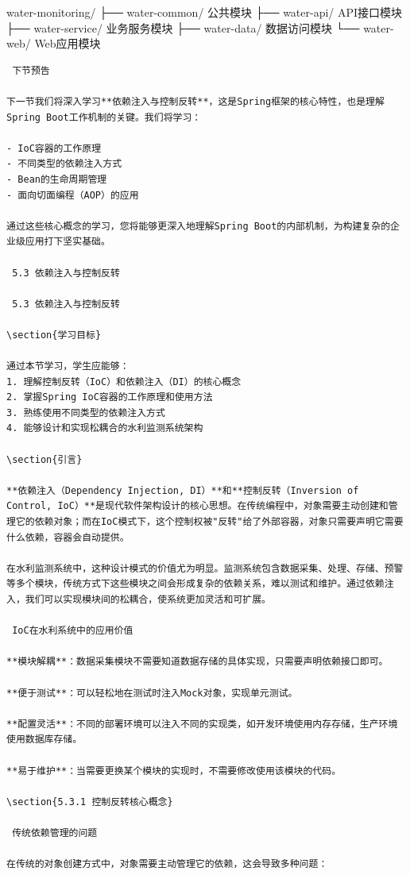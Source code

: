 water-monitoring/ ├── water-common/  公共模块 ├── water-api/  API接口模块\\
├── water-service/  业务服务模块 ├── water-data/  数据访问模块 └── water-web/  Web应用模块

\begin{lstlisting}
 下节预告

下一节我们将深入学习**依赖注入与控制反转**，这是Spring框架的核心特性，也是理解Spring Boot工作机制的关键。我们将学习：

- IoC容器的工作原理
- 不同类型的依赖注入方式
- Bean的生命周期管理
- 面向切面编程（AOP）的应用

通过这些核心概念的学习，您将能够更深入地理解Spring Boot的内部机制，为构建复杂的企业级应用打下坚实基础。

 5.3 依赖注入与控制反转

 5.3 依赖注入与控制反转

\section{学习目标}

通过本节学习，学生应能够：
1. 理解控制反转（IoC）和依赖注入（DI）的核心概念
2. 掌握Spring IoC容器的工作原理和使用方法
3. 熟练使用不同类型的依赖注入方式
4. 能够设计和实现松耦合的水利监测系统架构

\section{引言}

**依赖注入（Dependency Injection, DI）**和**控制反转（Inversion of Control, IoC）**是现代软件架构设计的核心思想。在传统编程中，对象需要主动创建和管理它的依赖对象；而在IoC模式下，这个控制权被"反转"给了外部容器，对象只需要声明它需要什么依赖，容器会自动提供。

在水利监测系统中，这种设计模式的价值尤为明显。监测系统包含数据采集、处理、存储、预警等多个模块，传统方式下这些模块之间会形成复杂的依赖关系，难以测试和维护。通过依赖注入，我们可以实现模块间的松耦合，使系统更加灵活和可扩展。

 IoC在水利系统中的应用价值

**模块解耦**：数据采集模块不需要知道数据存储的具体实现，只需要声明依赖接口即可。

**便于测试**：可以轻松地在测试时注入Mock对象，实现单元测试。

**配置灵活**：不同的部署环境可以注入不同的实现类，如开发环境使用内存存储，生产环境使用数据库存储。

**易于维护**：当需要更换某个模块的实现时，不需要修改使用该模块的代码。

\section{5.3.1 控制反转核心概念}

 传统依赖管理的问题

在传统的对象创建方式中，对象需要主动管理它的依赖，这会导致多种问题：
\end{lstlisting}

